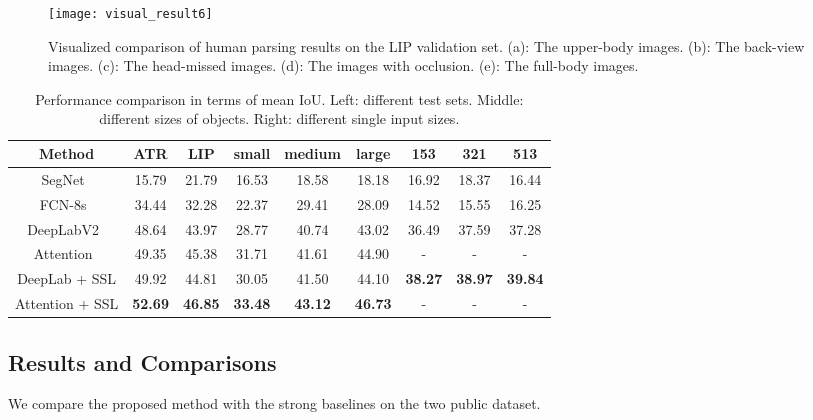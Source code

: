 \documentclass[10pt,twocolumn,letterpaper]{article}
\begin{document}
\begin{figure*}[t]
\centering
\texttt{[image: visual\_result6]}
\vspace{-4mm}
\caption{Visualized comparison of human parsing results on the LIP validation set. (a): The upper-body images. (b): The back-view images. (c): The head-missed images. (d): The images with occlusion. (e): The full-body images.}
\vspace{-6mm}
\label{fig:Comparison}
\end{figure*}

\begin{table}[]
\centering
\scriptsize
\tabcolsep 0.04in 
\begin{tabular}{c|cc|ccc|ccc}
\toprule[0.5pt]
Method                                 & ATR      & LIP       & small    & medium    & large    & 153            & 321            & 513          \\ \hline 
SegNet~\cite{badrinarayanan2015segnet} & 15.79    & 21.79     & 16.53    & 18.58     & 18.18    & 16.92          & 18.37          & 16.44        \\
FCN-8s~\cite{long2014fully}            & 34.44    & 32.28     & 22.37    & 29.41     & 28.09    & 14.52          & 15.55          & 16.25        \\ 
DeepLabV2~\cite{chen2014semantic}      & 48.64    & 43.97     & 28.77    & 40.74     & 43.02    & 36.49          & 37.59          & 37.28        \\
Attention~\cite{chen2015attention}     & 49.35    & 45.38     & 31.71    & 41.61     & 44.90    & -              & -              & -            \\ \hline
DeepLab + SSL                          & 49.92    & 44.81     & 30.05    & 41.50     & 44.10    & \textbf{38.27} & \textbf{38.97} & \textbf{39.84}  \\
Attention + SSL                        & \textbf{52.69} & \textbf{46.85} & \textbf{33.48} & \textbf{43.12} & \textbf{46.73} & -   & -      & -    \\
\toprule[0.5pt]
\end{tabular}
\vspace{-4mm}
\caption{Performance comparison in terms of mean IoU. Left: different test sets. Middle: different sizes of objects. Right: different single input sizes.}
\vspace{-6mm}
\label{tab: lip_size}
\end{table}

\subsection{Results and Comparisons}
We compare the proposed method with the strong baselines on the two public dataset.
\end{document}
